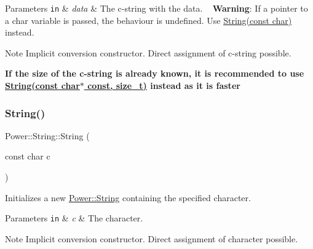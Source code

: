 \begin{DoxyParams}[1]{Parameters}
\mbox{\tt in}  & {\em data} & The c-\/string with the data. ~\newline
 {\bfseries Warning}\+: If a pointer to a char variable is passed, the behaviour is undefined. Use \hyperlink{class_power_1_1_string_ad14954dc3dfbdee2196a5298fe176632}{String(const char)} instead. \\
\hline
\end{DoxyParams}
\begin{DoxyNote}{Note}
Implicit conversion constructor. Direct assignment of c-\/string possible. 

{\bfseries If the size of the c-\/string is already known, it is recommended to use \hyperlink{class_power_1_1_string_a5cdd1615dce9d4a72dc5ca1e75763fc3}{String(const char$\ast$ const, size\+\_\+t)} instead as it is faster} 
\end{DoxyNote}
\mbox{\label{class_power_1_1_string_ad14954dc3dfbdee2196a5298fe176632}} 
\subsubsection{\texorpdfstring{String()}{String()}\hspace{0.1cm}{\footnotesize\ttfamily [4/7]}}
{\footnotesize\ttfamily Power\+::\+String\+::\+String (\begin{DoxyParamCaption}\item[{const char}]{c }\end{DoxyParamCaption})\hspace{0.3cm}{\ttfamily [inline]}}



Initializes a new \hyperlink{class_power_1_1_string}{Power\+::\+String} containing the specified character. 


\begin{DoxyParams}[1]{Parameters}
\mbox{\tt in}  & {\em c} & The character. \\
\hline
\end{DoxyParams}
\begin{DoxyNote}{Note}
Implicit conversion constructor. Direct assignment of character possible. 
\end{DoxyNote}
\mbox{\label{class_power_1_1_string_a5cdd1615dce9d4a72dc5ca1e75763fc3}} 
